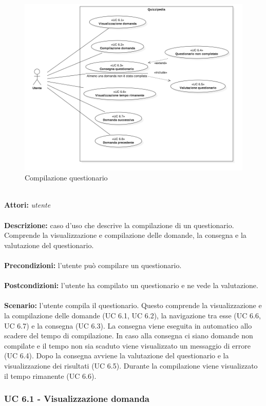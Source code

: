 \documentclass[a4paper,11pt]{article}
\begin{document}
\begin{figure}[h!]
\centering
\includegraphics[scale=0.5]{../immagini/UC6.png}
\caption{Compilazione questionario}
\end{figure}
\ \\
\textbf{Attori:} \textit{utente}
\\ \\
\textbf{Descrizione:} caso d'uso che descrive la compilazione di un questionario. Comprende la visualizzazione e compilazione delle domande, la consegna e la valutazione del questionario.\\
\\
\textbf{Precondizioni:} l'utente può compilare un questionario.\\
\\
\textbf{Postcondizioni:} l’utente ha compilato un questionario e ne vede la valutazione.\\
\\
\textbf{Scenario:} l’utente compila il questionario. Questo comprende la visualizzazione e la compilazione delle domande (UC 6.1, UC 6.2), la navigazione tra esse (UC 6.6, UC 6.7) e la consegna (UC 6.3). La consegna viene eseguita in automatico allo scadere del tempo di compilazione. In caso alla consegna ci siano domande non compilate e il tempo non sia scaduto viene visualizzato un messaggio di errore (UC 6.4). Dopo la consegna avviene la valutazione del questionario e la visualizzazione dei risultati (UC 6.5). Durante la compilazione viene visualizzato il tempo rimanente (UC 6.6).\\


\subsubsection{UC 6.1 - Visualizzazione domanda}
\end{document}
